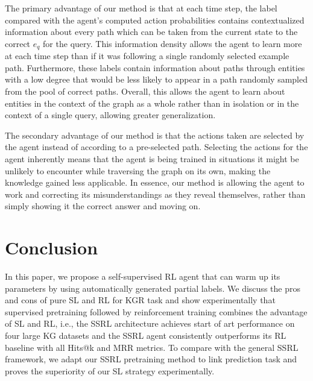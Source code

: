 \documentclass[lettersize,journal]{IEEEtran}
\begin{document}
The primary advantage of our method is that at each time step, the label compared with the agent's computed action probabilities contains contextualized information about every path which can be taken from the current state to the correct $e_q$ for the query. This information density allows the agent to learn more at each time step than if it was following a single randomly selected example path. Furthermore, these labels contain information about paths through entities with a low degree that would be less likely to appear in a path randomly sampled from the pool of correct paths. Overall, this allows the agent to learn about entities in the context of the graph as a whole rather than in isolation or in the context of a single query, allowing greater generalization.

The secondary advantage of our method is that the actions taken are selected by the agent instead of according to a pre-selected path. Selecting the actions for the agent inherently means that the agent is being trained in situations it might be unlikely to encounter while traversing the graph on its own, making the knowledge gained less applicable. In essence, our method is allowing the agent to work and correcting its misunderstandings as they reveal themselves, rather than simply showing it the correct answer and moving on.
 

\section{Conclusion}
In this paper, we propose a self-supervised RL agent that can warm up its parameters by using automatically generated partial labels. We discuss the pros and cons of pure SL and RL for KGR task and show experimentally that supervised pretraining followed by reinforcement training combines the advantage of SL and RL, i.e., the SSRL architecture achieves start of art performance on four large KG datasets and the SSRL agent consistently outperforms its RL baseline with all Hits@k and MRR metrics. To compare with the general SSRL framework, we adapt our SSRL pretraining method to link prediction task and proves the superiority of our SL strategy experimentally.


 
%













\end{document}
